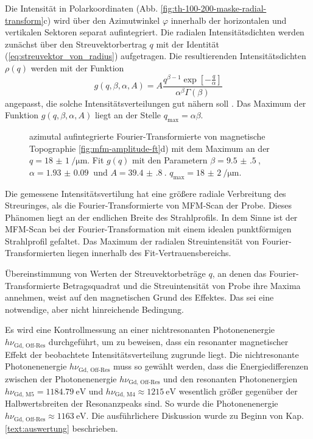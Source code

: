 \noindent
Die Intensität in Polarkoordinaten (Abb. \ref{fig:th-100-200-maske-radial-transform}c) wird über den Azimutwinkel $\varphi$ innerhalb der horizontalen und vertikalen Sektoren separat aufintegriert. Die radialen Intensitätsdichten werden zunächst über den Streuvektorbertrag $q$ mit der Identität (\ref{eq:streuvektor_von_radius}) aufgetragen. Die resultierenden Intensitätsdichten $\rho(q)$ werden mit der Funktion
\begin{equation}
    g(q, \beta, \alpha, A) = A\frac{q^{\beta-1}\exp\left[-\frac{q}{\alpha}\right]}{\alpha^\beta\Gamma(\beta)}
\end{equation}
angepasst, die solche Intensitätsverteilungen gut nähern soll \cite[Kap. 5]{bagschik_employing_2016}. Das Maximum der Funktion $g(q, \beta, \alpha, A)$ liegt an der Stelle $q_\text{max} = \alpha\beta$.

\begin{figure}[H]
    \centering
    
    \caption{azimutal aufintegrierte Fourier-Transformierte von magnetische Topographie  \ref{fig:mfm-amplitude-ft}d) mit dem Maximum an der $q =\SI{18(1)}{\per\micro\meter}$. Fit $g(q)$ mit den Parametern $\beta = \SI{9.5(5)}{}$, $\alpha = \SI{1.93(9)}{}$ und $A = \SI{39.4(8)}{}$. $q_\text{max} = \SI{18(2)}{\per\micro\meter}$.}
    \label{fig:radius_fit}
\end{figure}
\noindent
Die gemessene Intensitätsvertilung hat eine größere radiale Verbreitung des Streuringes, als die Fourier-Transformierte von MFM-Scan der Probe. Dieses Phänomen liegt an der endlichen Breite des Strahlprofils. In dem Sinne ist der MFM-Scan bei der Fourier-Transformation mit einem idealen punktförmigen Strahlprofil gefaltet. Das Maximum der radialen Streuintensität von Fourier-Transformierten liegen innerhalb des Fit-Vertrauensbereichs.

\noindent
Übereinstimmung von Werten der Streuvektorbeträge $q$, an denen das Fourier-Transformierte Betragsquadrat und die Streuintensität von Probe ihre Maxima annehmen, weist auf den magnetischen Grund des Effektes. Das sei eine notwendige, aber nicht hinreichende Bedingung.

\noindent
Es wird eine Kontrollmessung an einer nichtresonanten Photonenenergie $h\nu_{\text{Gd, Off-Res}}$ durchgeführt, um zu beweisen, dass ein resonanter magnetischer Effekt der beobachtete Intensitätsverteilung zugrunde liegt. Die nichtresonante Photonenenergie $h\nu_{\text{Gd, Off-Res}}$ muss so gewählt werden, dass die Energiedifferenzen zwischen der Photonenenergie $h\nu_{\text{Gd, Off-Res}}$ und den resonanten Photonenergien $h\nu_{\text{Gd, M5}} = \SI{1184,79}{\eV}$ und $h\nu_{\text{Gd, M4}} \approx \SI{1215}{\eV}$ wesentlich größer gegenüber der Halbwertsbreiten der Resonanzpeaks sind. So wurde die Photonenenergie $h\nu_{\text{Gd, Off-Res}} \approx \SI{1163}{\eV}$. Die ausführlichere Diskussion wurde zu Beginn von Kap. \ref{text:auswertung} beschrieben. %


